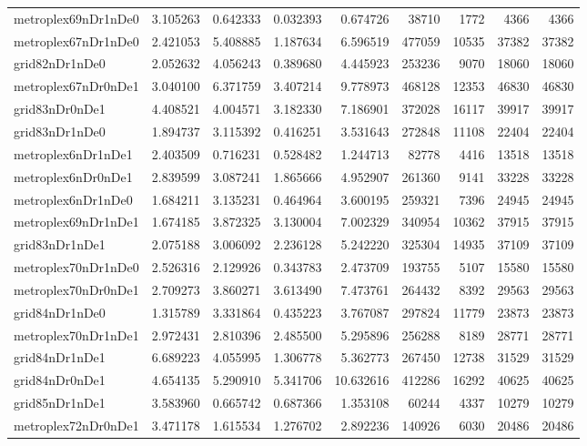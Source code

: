 \begin{longtable}{|l|r|r|r|r|r|r|r|r|}
metroplex69nDr1nDe0 & 3.105263 & 0.642333 & 0.032393 & 0.674726 & 38710 & 1772 & 4366 & 4366 \\
metroplex67nDr1nDe0 & 2.421053 & 5.408885 & 1.187634 & 6.596519 & 477059 & 10535 & 37382 & 37382 \\
grid82nDr1nDe0 & 2.052632 & 4.056243 & 0.389680 & 4.445923 & 253236 & 9070 & 18060 & 18060 \\
metroplex67nDr0nDe1 & 3.040100 & 6.371759 & 3.407214 & 9.778973 & 468128 & 12353 & 46830 & 46830 \\
grid83nDr0nDe1 & 4.408521 & 4.004571 & 3.182330 & 7.186901 & 372028 & 16117 & 39917 & 39917 \\
grid83nDr1nDe0 & 1.894737 & 3.115392 & 0.416251 & 3.531643 & 272848 & 11108 & 22404 & 22404 \\
metroplex6nDr1nDe1 & 2.403509 & 0.716231 & 0.528482 & 1.244713 & 82778 & 4416 & 13518 & 13518 \\
metroplex6nDr0nDe1 & 2.839599 & 3.087241 & 1.865666 & 4.952907 & 261360 & 9141 & 33228 & 33228 \\
metroplex6nDr1nDe0 & 1.684211 & 3.135231 & 0.464964 & 3.600195 & 259321 & 7396 & 24945 & 24945 \\
metroplex69nDr1nDe1 & 1.674185 & 3.872325 & 3.130004 & 7.002329 & 340954 & 10362 & 37915 & 37915 \\
grid83nDr1nDe1 & 2.075188 & 3.006092 & 2.236128 & 5.242220 & 325304 & 14935 & 37109 & 37109 \\
metroplex70nDr1nDe0 & 2.526316 & 2.129926 & 0.343783 & 2.473709 & 193755 & 5107 & 15580 & 15580 \\
metroplex70nDr0nDe1 & 2.709273 & 3.860271 & 3.613490 & 7.473761 & 264432 & 8392 & 29563 & 29563 \\
grid84nDr1nDe0 & 1.315789 & 3.331864 & 0.435223 & 3.767087 & 297824 & 11779 & 23873 & 23873 \\
metroplex70nDr1nDe1 & 2.972431 & 2.810396 & 2.485500 & 5.295896 & 256288 & 8189 & 28771 & 28771 \\
grid84nDr1nDe1 & 6.689223 & 4.055995 & 1.306778 & 5.362773 & 267450 & 12738 & 31529 & 31529 \\
grid84nDr0nDe1 & 4.654135 & 5.290910 & 5.341706 & 10.632616 & 412286 & 16292 & 40625 & 40625 \\
grid85nDr1nDe1 & 3.583960 & 0.665742 & 0.687366 & 1.353108 & 60244 & 4337 & 10279 & 10279 \\
metroplex72nDr0nDe1 & 3.471178 & 1.615534 & 1.276702 & 2.892236 & 140926 & 6030 & 20486 & 20486 \\

\end{longtable}
